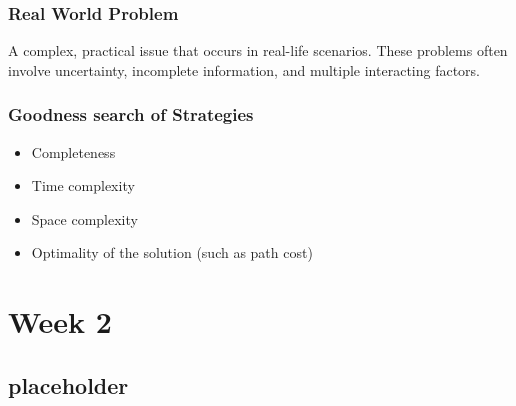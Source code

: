 \documentclass[a4paper, 12pt]{article}
\begin{document}
        \subsubsection*{Real World Problem}
        A complex, practical issue that occurs in real-life scenarios. These problems often involve uncertainty, incomplete information, and multiple interacting factors.
    \subsubsection{Goodness search of Strategies}
    \begin{itemize}
        \item Completeness
        \item Time complexity
        \item Space complexity
        \item Optimality of the solution (such as path cost)
    \end{itemize}
    
\newpage
\section{Week 2}
    \subsection{placeholder}
\end{document}

